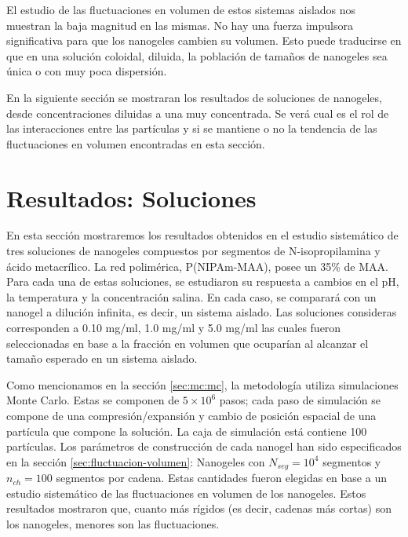 	
	El estudio de las fluctuaciones en volumen de estos sistemas aislados nos muestran la baja magnitud en las mismas. No hay una fuerza impulsora significativa para que los nanogeles cambien su volumen. Esto puede traducirse en que en una soluci\'on coloidal, diluida, la poblaci\'on de tama\~nos de nanogeles sea \'unica o con muy poca dispersi\'on. 
	
	En la siguiente secci\'on se mostraran los resultados de soluciones de nanogeles, desde concentraciones diluidas a una muy concentrada.
	Se ver\'a cual es el rol de las interacciones entre las part\'iculas y si se mantiene o no la tendencia de las fluctuaciones en volumen encontradas en esta secci\'on.
	
	\section{Resultados: Soluciones}
	
	En esta secci\'on mostraremos los resultados obtenidos en el estudio sistem\'atico de tres soluciones de nanogeles compuestos por segmentos de N-isopropilamina y \'acido metacr\'ilico. La red polim\'erica, P(NIPAm-MAA), posee un 35\% de MAA. Para cada una de estas soluciones, se estudiaron su respuesta a cambios en el pH, la temperatura y la concentraci\'on salina. En cada caso, se comparar\'a con un nanogel a diluci\'on infinita, es decir, un sistema aislado. Las soluciones consideras corresponden a 0.10 mg/ml, 1.0 mg/ml y 5.0 mg/ml las cuales fueron seleccionadas en base a la fracción en volumen que ocupar\'ian al alcanzar el tama\~no esperado en un sistema aislado.
	
	Como mencionamos en la secci\'on \ref{sec:mc:mc}, la metodolog\'ia utiliza simulaciones Monte Carlo. Estas se componen de $5\times 10^6$ pasos; cada paso de simulaci\'on se compone de una compresi\'on/expansi\'on y cambio de posici\'on espacial de una part\'icula que compone la soluci\'on. La caja de simulaci\'on est\'a contiene 100 part\'iculas. Los par\'ametros de construcci\'on de cada nanogel han sido especificados en la secci\'on \ref{sec:fluctuacion-volumen}: Nanogeles con $N_{seg} = 10^4$ segmentos y $n_{ch} = 100$ segmentos por cadena. Estas cantidades fueron elegidas en base a un estudio sistem\'atico de las fluctuaciones en volumen de los nanogeles. Estos resultados mostraron que, cuanto m\'as r\'igidos (es decir, cadenas m\'as cortas) son los nanogeles, menores son las fluctuaciones. %
	
